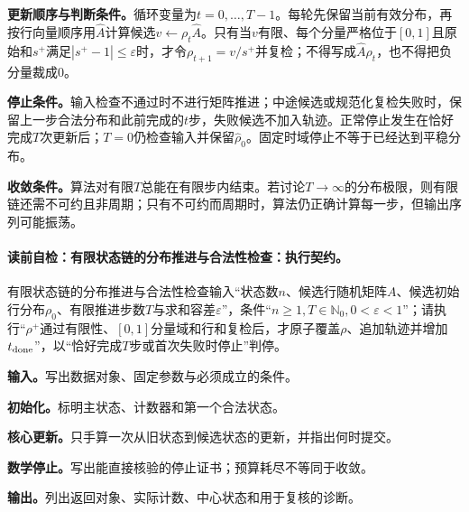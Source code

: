 \label{struct:V5-C01-CH23}
\textbf{更新顺序与判断条件。}循环变量为$t=0,\ldots,T-1$。每轮先保留当前有效分布，再按行向量顺序用$\widehat A$计算候选$v\leftarrow\rho_t\widehat A$。只有当$v$有限、每个分量严格位于$[0,1]$且原始和$s^+$满足$|s^+-1|\le\varepsilon$时，才令$\rho_{t+1}=v/s^+$并复检；不得写成$\widehat A\rho_t$，也不得把负分量裁成$0$。

\label{struct:V5-C01-CH24}
\textbf{停止条件。}输入检查不通过时不进行矩阵推进；中途候选或规范化复检失败时，保留上一步合法分布和此前完成的$t$步，失败候选不加入轨迹。正常停止发生在恰好完成$T$次更新后；$T=0$仍检查输入并保留$\widehat\rho_0$。固定时域停止不等于已经达到平稳分布。

\label{struct:V5-C01-CH25}
\textbf{收敛条件。}算法对有限$T$总能在有限步内结束。若讨论$T\to\infty$的分布极限，则有限链还需不可约且非周期；只有不可约而周期时，算法仍正确计算每一步，但输出序列可能振荡。

\begingroup
{}
\paragraph{读前自检：有限状态链的分布推进与合法性检查：执行契约。}有限状态链的分布推进与合法性检查输入“状态数$n$、候选行随机矩阵$A$、候选初始行分布$\rho_0$、有限推进步数$T$与求和容差$\varepsilon$”，条件“$n\ge1,T\in\mathbb N_0,0<\varepsilon<1$”；请执行“$\rho^+$通过有限性、$[0,1]$分量域和行和复检后，才原子覆盖$\rho$、追加轨迹并增加$t_{\rm done}$”，以“恰好完成$T$步或首次失败时停止”判停。\par
\begin{keypointbox}[title={有限状态链的分布推进与合法性检查：五步阅读}]
\textbf{输入。}写出数据对象、固定参数与必须成立的条件。\par
\textbf{初始化。}标明主状态、计数器和第一个合法状态。\par
\textbf{核心更新。}只手算一次从旧状态到候选状态的更新，并指出何时提交。\par
\textbf{数学停止。}写出能直接核验的停止证书；预算耗尽不等同于收敛。\par
\textbf{输出。}列出返回对象、实际计数、中心状态和用于复核的诊断。
\end{keypointbox}

